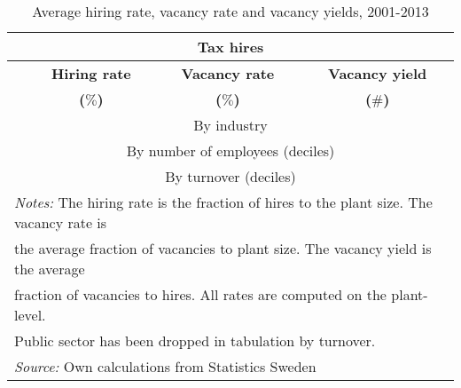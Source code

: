    
		\begin{table}[htbp]\centering
		\scriptsize
      \caption{\label{tab:vacancy_yield_tax} Average hiring rate, vacancy rate and vacancy yields, 2001-2013
      \textbf{} }\begin{tabularx} {\textwidth} {  l  c  c  c} \\ \hline %
			     \multicolumn{4}{c}{ \textbf{Tax hires}}  \\ \midrule
      \textbf{ } & \textbf{ Hiring rate } & \textbf{ Vacancy rate } & \textbf{  Vacancy yield  } \\
			\textbf{ } & \textbf{  ($\%$) } & \textbf{ ($\%$) } & \textbf{ ($\#$) } \\
      \midrule
			    \multicolumn{4}{c}{By industry} \\
			\midrule

     \midrule
						   \multicolumn{4}{c}{By number of employees (deciles)} \\
			\midrule

     \midrule
						  \multicolumn{4}{c}{By turnover (deciles)} \\
			\midrule

				\hline
      \multicolumn{4}{l}{\footnotesize{\emph{Notes:} The hiring rate is the fraction of hires to the plant size.  The vacancy rate is }} \\
			\multicolumn{4}{l}{\footnotesize{the average fraction of vacancies to plant size. The vacancy yield is the average} } \\
			\multicolumn{4}{l}{\footnotesize{ fraction of vacancies to hires. All rates are computed  on the plant-level.}} \\
			\multicolumn{4}{l}{\footnotesize{ Public sector has been dropped in tabulation by turnover.} } \\ 
			\multicolumn{4}{l}{\footnotesize{\emph{Source:} Own calculations from Statistics Sweden } }

      \end{tabularx}
      \end{table}
